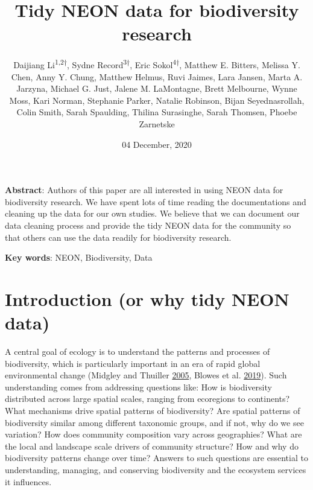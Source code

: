 \documentclass[
  12pt,
]{article}
\title{Tidy NEON data for biodiversity research}
\author{Daijiang Li\textsuperscript{1,2†}, Sydne Record\textsuperscript{3†}, Eric Sokol\textsuperscript{4†}, Matthew E. Bitters, Melissa Y. Chen, Anny Y. Chung, Matthew Helmus, Ruvi Jaimes, Lara Jansen, Marta A. Jarzyna, Michael G. Just, Jalene M. LaMontagne, Brett Melbourne, Wynne Moss, Kari Norman, Stephanie Parker, Natalie Robinson, Bijan Seyednasrollah, Colin Smith, Sarah Spaulding, Thilina Surasinghe, Sarah Thomsen, Phoebe Zarnetske}
\date{04 December, 2020}
\makeatletter
\newcommand\iraggedright{%
  \let\\\@centercr\@rightskip\@flushglue \rightskip\@rightskip
  \leftskip\z@skip}
\makeatother
\begin{document}
\maketitle

\iraggedright

\textbf{Abstract}: Authors of this paper are all interested in using NEON data for biodiversity research. We have spent lots of time reading the documentations and cleaning up the data for our own studies. We believe that we can document our data cleaning process and provide the tidy NEON data for the community so that others can use the data readily for biodiversity research.

\textbf{Key words}: NEON, Biodiversity, Data

\hypertarget{introduction-or-why-tidy-neon-data}{%
\section{Introduction (or why tidy NEON data)}\label{introduction-or-why-tidy-neon-data}}

A central goal of ecology is to understand the patterns and processes of biodiversity, which is particularly important in an era of rapid global environmental change (Midgley and Thuiller \protect\hyperlink{ref-midgley2005global}{2005}, Blowes et al. \protect\hyperlink{ref-blowes2019geography}{2019}). Such understanding comes from addressing questions like: How is biodiversity distributed across large spatial scales, ranging from ecoregions to continents? What mechanisms drive spatial patterns of biodiversity? Are spatial patterns of biodiversity similar among different taxonomic groups, and if not, why do we see variation? How does community composition vary across geographies? What are the local and landscape scale drivers of community structure? How and why do biodiversity patterns change over time? Answers to such questions are essential to understanding, managing, and conserving biodiversity and the ecosystem services it influences.
\end{document}
